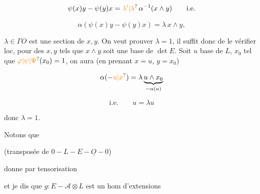 \[ \psi(x)y-\psi(y)x=\unsure{\lambda'|\lambda}\,\alpha^{-1}(x\wedge y)\qquad\text{i.e.} \]


\[ \alpha(\psi(x)y-\psi(y)x)=\lambda\,x\wedge y, \]

  $\lambda\in\Gamma O$ est une section  de $x,y$. On veut prouver $\lambda=1$, il suffit donc de le vérifier loc, pour des $x,y$ tels que $x\wedge y$ soit une base de $\det E$. Soit $u$ base de $L$, $x_0$ tel que $\unsure{\varphi|\psi|\Psi}(x_0)=1$, on aura (en prenant $x=u$, $y=x_0$)

\[ \alpha(-\unsure{u|x})=\lambda\underbrace{u\wedge x_0}_{-\alpha(u)} \]

\[ \text{i.e.}\qquad u=\lambda u \]

donc  $\lambda=1$.

Notons que


(transposée de $0-L-E-\underline O-0$)

donne par tensorisation


et je dis que $g:E-\mathcal A\otimes L$ est un hom d'extensions
